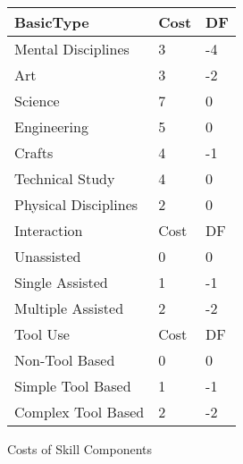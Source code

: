 \begin{SHTable}
	\begin{tabular}{lll}
    BasicType           & Cost          & DF \\
	\hline
	Mental Disciplines      &       3         & -4 \\
	Art                     &       3         & -2 \\
	Science                 &       7         & 0 \\
	Engineering             &       5         & 0 \\
	Crafts                  &       4         & -1 \\
	Technical Study         &       4         & 0 \\
	Physical Disciplines    &       2         & 0 \\
    \hline
    Interaction                    & Cost          & DF \\
	\hline
	Unassisted              &       0         & 0 \\
	Single Assisted         &       1         & -1 \\
	Multiple Assisted       &       2         & -2 \\    \hline
    Tool Use                       & Cost          & DF \\
	\hline
	Non-Tool Based          &       0         & 0 \\
	Simple Tool Based      &        1         & -1 \\
	Complex Tool Based      &       2         & -2 \\    \hline
	\end{tabular}
    \caption{Costs of Skill Components}\label{Table:SkillComponentCosts}
\end{SHTable}


